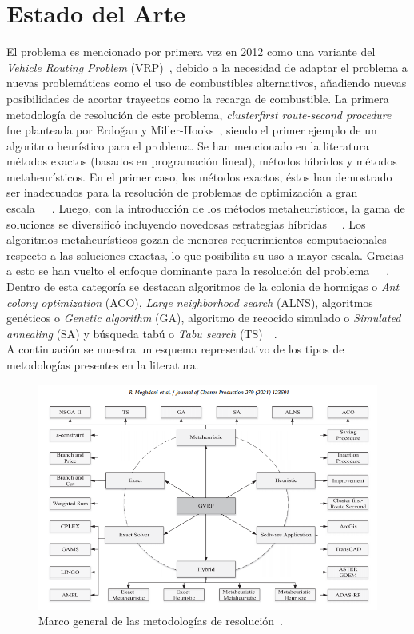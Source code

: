 \documentclass[letter, 10pt]{article}
\begin{document}
\section{Estado del Arte}
El problema es mencionado por primera vez en 2012 como una variante del \textit{Vehicle Routing Problem} (VRP)~\cite{erdogan_green_2012}, debido a la necesidad de adaptar el problema a nuevas problemáticas como el uso de combustibles alternativos, añadiendo nuevas posibilidades de acortar trayectos como la recarga de combustible. La primera metodología de resolución de este problema, \textit{clusterfirst route-second procedure} fue planteada por Erdoğan y Miller-Hooks~\cite{erdogan_green_2012}, siendo el primer ejemplo de un algoritmo heurístico para el problema. Se han mencionado en la literatura métodos exactos (basados en programación lineal), métodos híbridos y métodos metaheurísticos. En el primer caso, los métodos exactos, éstos han demostrado ser inadecuados para la resolución de problemas de optimización a gran escala~\cite{koc_green_2016}~\cite{bruglieri_more_2019}~\cite{bruglieri_new_2016}. Luego, con la introducción de los métodos metaheurísticos, la gama de soluciones se diversificó incluyendo novedosas estrategias híbridas ~\cite{zhang_meta-heuristic_2018}~\cite{yin_adaptive_2016}. Los algoritmos metaheurísticos gozan de menores requerimientos computacionales respecto a las soluciones exactas, lo que posibilita su uso a mayor escala. Gracias a esto se han vuelto el enfoque dominante para la resolución del problema~\cite{peng_memetic_2019}~\cite{asghari_green_2020}~\cite{moghdani_green_2021}. Dentro de esta categoría se destacan algoritmos de la colonia de hormigas o \textit{Ant colony optimization} (ACO), \textit{Large neighborhood search } (ALNS), algoritmos genéticos o \textit{Genetic algorithm} (GA), algoritmo de recocido simulado o \textit{Simulated annealing} (SA) y búsqueda tabú o \textit{Tabu search } (TS)~\cite{moghdani_green_2021}~\cite{asghari_green_2020}.
\\A continuación se muestra un esquema representativo de los tipos de metodologías presentes en la literatura.
\begin{center}
\begin{figure}[h!]
\includegraphics[width=1\textwidth]{paper1.PNG}
\caption{Marco general de las metodologías de resolución~\cite{moghdani_green_2021}.}
\end{figure}
\end{center}
\end{document}
